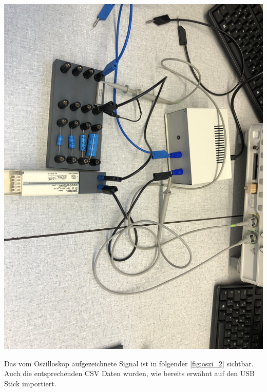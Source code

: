 \documentclass[11pt,ngerman]{scrartcl}
\begin{document}
\begin{center}
	\begin{minipage}[t]{0.7\textwidth}
		\includegraphics[width=\textwidth]{aufbau3}
		\label{fig:aufbau3}
	\end{minipage}
\end{center}

Das vom Oszilloskop aufgezeichnete Signal ist in folgender \autoref{fig:oszi_2} sichtbar. Auch die entsprechenden CSV Daten wurden, wie bereits erwähnt auf den USB Stick importiert.
\end{document}
